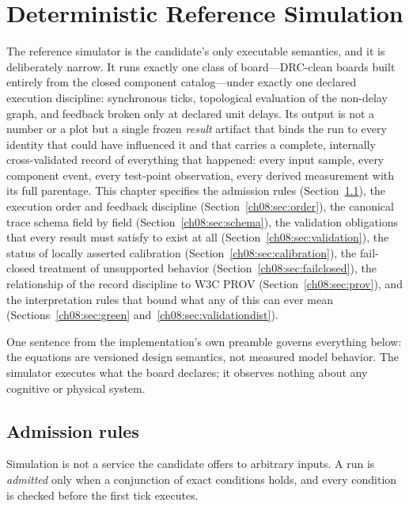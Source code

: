 \chapter{Deterministic Reference Simulation}\label{ch08:sim}

The reference simulator is the candidate's only executable semantics, and it is deliberately narrow. It runs exactly one class of board---DRC-clean boards built entirely from the closed component catalog---under exactly one declared execution discipline: synchronous ticks, topological evaluation of the non-delay graph, and feedback broken only at declared unit delays. Its output is not a number or a plot but a single frozen \emph{result} artifact that binds the run to every identity that could have influenced it and that carries a complete, internally cross-validated record of everything that happened: every input sample, every component event, every test-point observation, every derived measurement with its full parentage. This chapter specifies the admission rules (Section~\ref{ch08:sec:admission}), the execution order and feedback discipline (Section~\ref{ch08:sec:order}), the canonical trace schema field by field (Section~\ref{ch08:sec:schema}), the validation obligations that every result must satisfy to exist at all (Section~\ref{ch08:sec:validation}), the status of locally asserted calibration (Section~\ref{ch08:sec:calibration}), the fail-closed treatment of unsupported behavior (Section~\ref{ch08:sec:failclosed}), the relationship of the record discipline to W3C PROV (Section~\ref{ch08:sec:prov}), and the interpretation rules that bound what any of this can ever mean (Sections~\ref{ch08:sec:green} and~\ref{ch08:sec:validationdist}).

One sentence from the implementation's own preamble governs everything below: the equations are versioned design semantics, not measured model behavior. The simulator executes what the board declares; it observes nothing about any cognitive or physical system.

\section{Admission rules}\label{ch08:sec:admission}

Simulation is not a service the candidate offers to arbitrary inputs. A run is \emph{admitted} only when a conjunction of exact conditions holds, and every condition is checked before the first tick executes.

